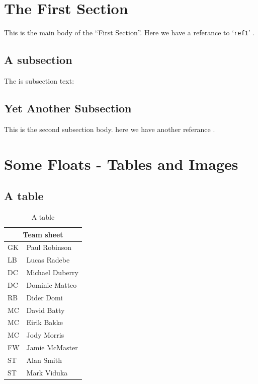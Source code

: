 \documentclass[../article.tex]{subfiles}
\begin{document}
\validinsub{%
%
\tableofcontents%
\listoffigures%
\listoftables%
\clearpage%
}

\section{The First Section}

This is the main body of the ``First Section''. Here we have a referance
to `\verb|ref1|' \cite{ref1}.

\subsection{A subsection}

The is subsection text: \blindtext

\subsection{Yet Another Subsection}

This is the second subsection body. here we have another referance \cite{ref3}.

\section{Some Floats - Tables and Images}

\subsection{A table}

\begin{table}[H]
	\centering
	\begin{tabular}{ |l|l| }
	\hline
	\multicolumn{2}{|c|}{Team sheet} \\
	\hline
	GK & Paul Robinson \\
	LB & Lucas Radebe \\
	DC & Michael Duberry \\
	DC & Dominic Matteo \\
	RB & Dider Domi \\
	MC & David Batty \\
	MC & Eirik Bakke \\
	MC & Jody Morris \\
	FW & Jamie McMaster \\
	ST & Alan Smith \\
	ST & Mark Viduka \\
	\hline
	\end{tabular}
	\caption{A table}
\end{table}
\end{document}
